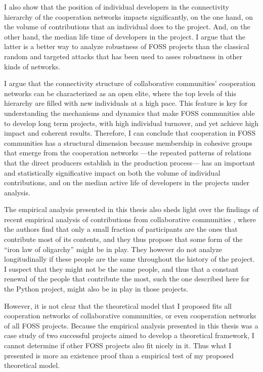 I also show that the position of individual developers in the connectivity hierarchy of the cooperation networks impacts significantly, on the one hand, on the volume of contributions that an individual does to the project. And, on the other hand, the median life time of developers in the project. I argue that the latter is a better way to analyze robustness of FOSS projects than the classical random and targeted attacks that has been used to asses robustness in other kinds of networks.

I argue that the connectivity structure of collaborative communities' cooperation networks can be characterized as an open elite, where the top levels of this hierarchy are filled with new individuals at a high pace. This feature is key for understanding the mechanisms and dynamics that make FOSS communities able to develop long term projects, with high individual turnover, and yet achieve high impact and coherent results. Therefore, I can conclude that cooperation in FOSS communities has a structural dimension because membership in cohesive groups that emerge from the cooperation networks ---the repeated patterns of relations that the direct producers establish in the production process--- has an important and statistically significative impact on both the volume of individual contributions, and on the median active life of developers in the projects under analysis.

The empirical analysis presented in this thesis also sheds light over the findings of recent empirical analysis of contributions from collaborative communities \citep{shaw:2014}, where the authors find that only a small fraction of participants are the ones that contribute most of its contents, and they thus propose that some form of the ``iron law of oligarchy'' \citep{michels:1915} might be in play. They however do not analyze longitudinally if these people are the same throughout the history of the project. I suspect that they might not be the same people, and thus that a constant renewal of the people that contribute the most, such the one described here for the Python project, might also be in play in those projects. 

However, it is not clear that the theoretical model that I proposed fits all cooperation networks of collaborative communities, or even cooperation networks of all FOSS projects. Because the empirical analysis presented in this thesis was a case study of two successful projects aimed to develop a theoretical framework, I cannot determine if other FOSS projects also fit nicely in it. Thus what I presented is more an existence proof than a empirical test of my proposed theoretical model.

